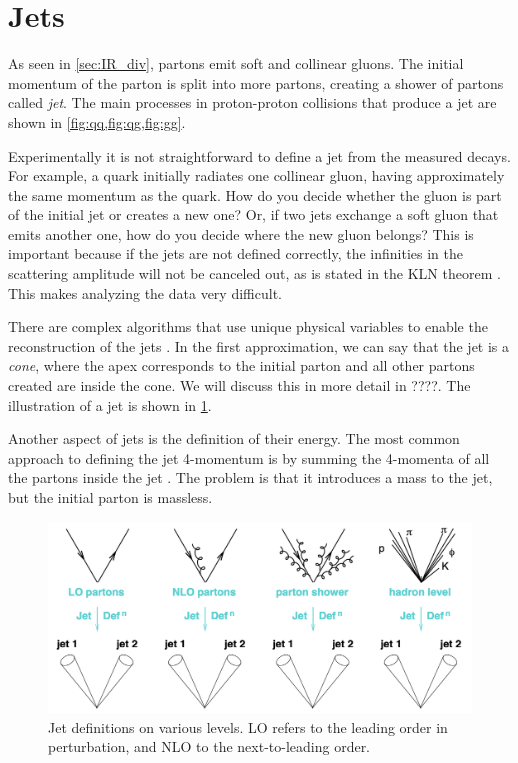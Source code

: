 \section{Jets}
\label{sec:jet}
As seen in \cref{sec:IR_div}, partons emit soft and collinear gluons.
The initial momentum of the parton is split into more partons, creating a shower of partons called \emph{jet}.
The main processes in proton-proton collisions that produce a jet are shown in \cref{fig:qq,fig:qg,fig:gg}.

Experimentally it is not straightforward to define a jet from the measured decays.
For example, a quark initially radiates one collinear gluon, having approximately the same momentum as the quark.
How do you decide whether the gluon is part of the initial jet or creates a new one?
Or, if two jets exchange a soft gluon that emits another one, how do you decide where the new gluon belongs?
This is important because if the jets are not defined correctly, the infinities in the scattering amplitude will not be canceled out, as is stated in the KLN theorem \cite{IR_sing_K,IR_sing_LN}.
This makes analyzing the data very difficult. 

There are complex algorithms that use unique physical variables to enable the reconstruction of the jets \cite{antikt}.
In the first approximation, we can say that the jet is a \emph{cone}, where the apex corresponds to the initial parton and all other partons created are inside the cone. 
We will discuss this in more detail in ????.
The illustration of a jet is shown in \cref{fig:jet}.

Another aspect of jets is the definition of their energy.
The most common approach to defining the jet 4-momentum is by summing the 4-momenta of all the partons inside the jet \cite{antikt}.
The problem is that it introduces a mass to the jet, but the initial parton is massless.

\begin{figure}[htb]
    \centering
    \includegraphics[width=0.7\linewidth]{src/img/jet.png}
    \caption[Jet definitions on various levels.]{Jet definitions on various levels. LO refers to the leading order in perturbation, and NLO to the next-to-leading order.\footnotemark}
    \label{fig:jet}
\end{figure}

